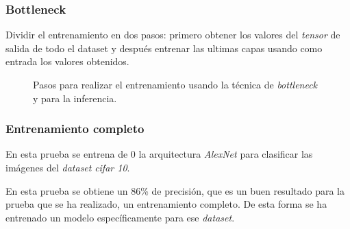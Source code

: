 \documentclass{beamer}
\begin{document}
\begin{frame}
\frametitle{Bottleneck}

Dividir el entrenamiento en dos pasos: primero obtener los valores del \textit{tensor} de salida de todo el dataset y después entrenar las ultimas capas usando como entrada los valores obtenidos.

\begin{figure}[H]
\centering
{}%
\qquad
{}%
\caption{Pasos para realizar el entrenamiento usando la técnica de \textit{bottleneck} y para la inferencia.}
\end{figure}

\end{frame}



\begin{frame}
\frametitle{Entrenamiento completo}

En esta prueba se entrena de 0 la arquitectura \textit{AlexNet} para clasificar las imágenes del \textit{dataset} \textit{cifar 10}.

\begin{table}[H]
\centering
{}
\caption{Resultado entrenamiento completo.}
\end{table}

En esta prueba se obtiene un 86\% de precisión, que es un buen resultado para la prueba que se ha realizado, un entrenamiento completo. De esta forma se ha entrenado un modelo específicamente para ese \textit{dataset}.

\end{frame}
\end{document}
